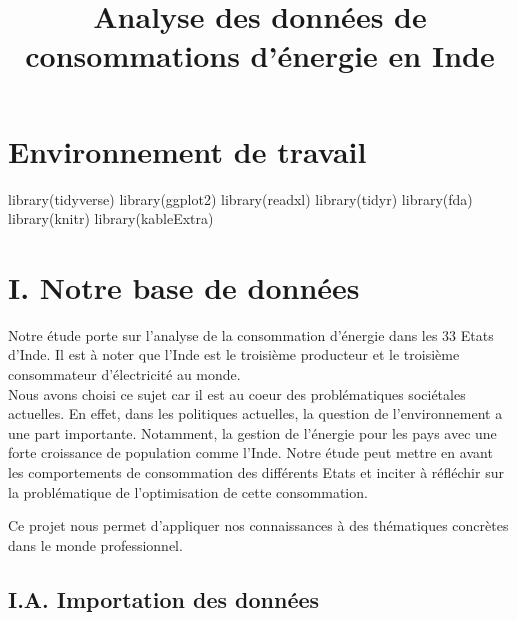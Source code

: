 \documentclass[
]{article}
\title{Analyse des données de consommations d'énergie en Inde}
\author{}
\date{\vspace{-2.5em}}
\newenvironment{Shaded}{\begin{snugshade}}{\end{snugshade}}
\newcommand{\FunctionTok}[1]{\textcolor[rgb]{0.00,0.00,0.00}{#1}}
\newcommand{\NormalTok}[1]{#1}
\begin{document}
\maketitle

\hypertarget{environnement-de-travail}{%
\section{Environnement de travail}\label{environnement-de-travail}}

\begin{Shaded}
\begin{Highlighting}[]
\FunctionTok{library}\NormalTok{(tidyverse)}
\FunctionTok{library}\NormalTok{(ggplot2)}
\FunctionTok{library}\NormalTok{(readxl)}
\FunctionTok{library}\NormalTok{(tidyr)}
\FunctionTok{library}\NormalTok{(fda)}
\FunctionTok{library}\NormalTok{(knitr)}
\FunctionTok{library}\NormalTok{(kableExtra)}
\end{Highlighting}
\end{Shaded}

\hypertarget{i.-notre-base-de-donnuxe9es}{%
\section{I. Notre base de données}\label{i.-notre-base-de-donnuxe9es}}

Notre étude porte sur l'analyse de la consommation d'énergie dans les 33
Etats d'Inde. Il est à noter que l'Inde est le troisième producteur et
le troisième consommateur d'électricité au monde.\\
Nous avons choisi ce sujet car il est au coeur des problématiques
sociétales actuelles. En effet, dans les politiques actuelles, la
question de l'environnement a une part importante. Notamment, la gestion
de l'énergie pour les pays avec une forte croissance de population comme
l'Inde. Notre étude peut mettre en avant les comportements de
consommation des différents Etats et inciter à réfléchir sur la
problématique de l'optimisation de cette consommation.

Ce projet nous permet d'appliquer nos connaissances à des thématiques
concrètes dans le monde professionnel.

\hypertarget{i.a.-importation-des-donnuxe9es}{%
\subsection{I.A. Importation des
données}\label{i.a.-importation-des-donnuxe9es}}
\end{document}
